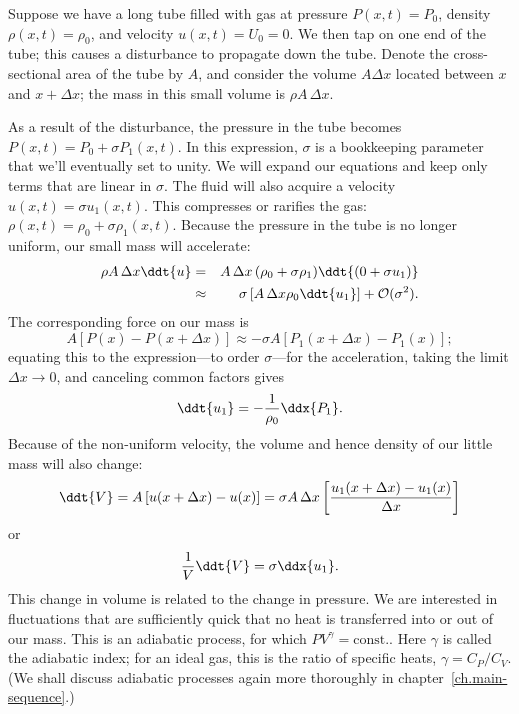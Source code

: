 \begin{sidebar}
\label{b.sound-speed}
Suppose we have a long tube filled with gas at pressure $P(x,t) = P_{0}$, density $\rho(x,t) = \rho_{0}$, and velocity $u(x,t) = U_{0} = 0$. We then tap on one end of the tube; this causes a disturbance to propagate down the tube. Denote the cross-sectional area of the tube by $A$, and consider the volume $A\Delta x$ located between $x$ and $x+\Delta x$; the mass in this small volume is $\rho A\,\Delta x$.

As a result of the disturbance, the pressure in the tube becomes $P(x,t) = P_{0}+\sigma P_{1}(x,t)$. In this expression, $\sigma$ is a bookkeeping parameter that we'll eventually set to unity. We will expand our equations and keep only terms that are linear in $\sigma$. The fluid will also acquire a velocity $u(x,t) = \sigma u_{1}(x,t)$. This compresses or rarifies the gas: $\rho(x,t) = \rho_{0} + \sigma\rho_{1}(x,t)$.  Because the pressure in the tube is no longer uniform, our small mass will accelerate: 
\begin{eqnarray*}
	\rho A\,\Delta x \ddt{u} &=& A\,\Delta x\,(\rho_{0} + \sigma\rho_{1})\ddt{(0 + \sigma u_{1})}\\
	&\approx& \sigma\left[A\,\Delta x \rho_{0}\ddt{u_{1}}\right] + \mathcal{O}(\sigma^{2}).
\end{eqnarray*}
The corresponding force on our mass is
\[
	A \left[ P(x) - P(x+\Delta x) \right] \approx -\sigma A \left[P_{1}(x+\Delta x)-P_{1}(x)\right];
\]
equating this to the expression---to order $\sigma$---for the acceleration, taking the limit $\Delta x\to 0$, and canceling common factors gives
\begin{equation}\label{e.sound-speed-ut}
	\ddt{u_{1}} = -\frac{1}{\rho_{0}}\ddx{P_{1}}.
\end{equation}
Because of the non-uniform velocity, the volume and hence density of our little mass will also change:
\[
	\ddt{V} = A\left[u(x+\Delta x)-u(x)\right] 
		= \sigma A\,\Delta x\left[\frac{u_{1}(x+\Delta x)-u_{1}(x)}{\Delta x}\right]
\]
or
\begin{equation}\label{e.sound-speed-lnVt}
	\frac{1}{V}\ddt{V} = \sigma \ddx{u_{1}}.
\end{equation}
This change in volume is related to the change in pressure. We are interested in fluctuations that are sufficiently quick that no heat is transferred into or out of our mass. This is an adiabatic process, for which $PV^{\gamma} = \mathrm{const.}$. Here $\gamma$ is called the adiabatic index; for an ideal gas, this is the ratio of specific heats, $\gamma = C_{P}/C_{V}$. (We shall discuss adiabatic processes again more thoroughly in chapter~\ref{ch.main-sequence}.)


\end{sidebar}
